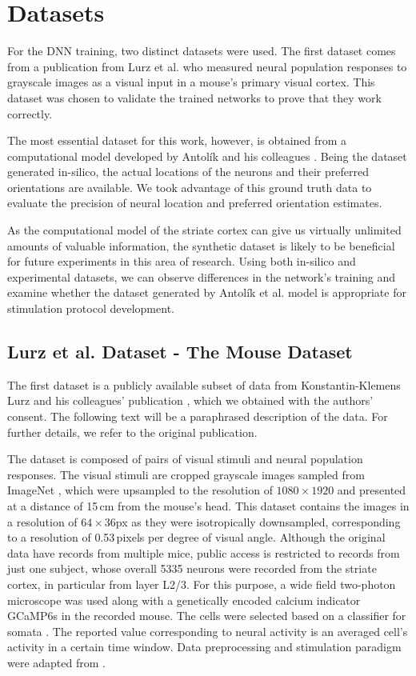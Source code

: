 \section{Datasets}

For the DNN training, two distinct datasets were used. The first dataset comes from a publication from Lurz et al. \citep{lurz2021generalization} who measured neural population responses to grayscale images as a visual input in a mouse's primary visual cortex. This dataset was chosen to validate the trained networks to prove that they work correctly.

The most essential dataset for this work, however, is obtained from a computational model developed by Antolík and his colleagues \citep{antolik2019comprehensive}. Being the dataset generated in-silico, the actual locations of the neurons and their preferred orientations are available. We took advantage of this ground truth data to evaluate the precision of neural location and preferred orientation estimates.

As the computational model of the striate cortex can give us virtually unlimited amounts of valuable information, the synthetic dataset is likely to be beneficial for future experiments in this area of research. Using both in-silico and experimental datasets, we can observe differences in the network’s training and examine whether the dataset generated by Antolík et al. model is appropriate for stimulation protocol development.

\subsection{Lurz et al. Dataset - The Mouse Dataset}

The first dataset is a publicly available subset of data from Konstantin-Klemens Lurz and his colleagues' publication \citep{lurz2021generalization}, which we obtained with the authors' consent. The following text will be a paraphrased description of the data. For further details, we refer to the original publication.

The dataset is composed of pairs of visual stimuli and neural population responses. The visual stimuli are cropped grayscale images sampled from ImageNet \citep{deng2009imagenet}, which were upsampled to the resolution of $1080 \times 1920$ and presented at a distance of 15\,cm from the mouse’s head. This dataset contains the images in a resolution of $64 \times 36$px as they were isotropically downsampled, corresponding to a resolution of 0.53\,pixels per degree of visual angle. Although the original data have records from multiple mice, public access is restricted to records from just one subject, whose overall 5335 neurons were recorded from the striate cortex, in particular from layer L2/3. For this purpose, a wide field two-photon microscope \citep{sofroniew2016large} was used along with a genetically encoded calcium indicator GCaMP6s in the recorded mouse. The cells were selected based on a classifier for somata \citep{pnevmatikakis2016simultaneous}. The reported value corresponding to neural activity is an averaged cell’s activity in a certain time window. Data preprocessing and stimulation paradigm were adapted from \citep{walker2019inception}.

